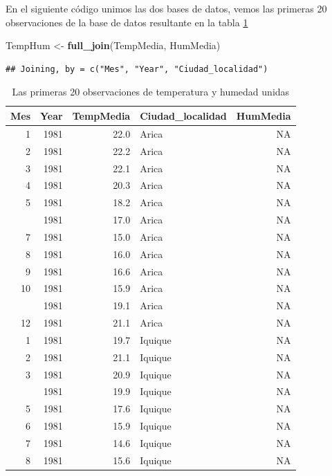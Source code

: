 \documentclass[]{book}
\newenvironment{Shaded}{\begin{snugshade}}{\end{snugshade}}
\newcommand{\KeywordTok}[1]{\textcolor[rgb]{0.13,0.29,0.53}{\textbf{#1}}}
\newcommand{\NormalTok}[1]{#1}
\newcommand{\StringTok}[1]{\textcolor[rgb]{0.31,0.60,0.02}{#1}}
\begin{document}
En el siguiente código unimos las dos bases de datos, vemos las primeras
20 observaciones de la base de datos resultante en la tabla
\ref{tab:TempHum}

\begin{Shaded}
\begin{Highlighting}[]
\NormalTok{TempHum <-}\StringTok{ }\KeywordTok{full_join}\NormalTok{(TempMedia, HumMedia)}
\end{Highlighting}
\end{Shaded}

\begin{verbatim}
## Joining, by = c("Mes", "Year", "Ciudad_localidad")
\end{verbatim}

\begin{table}

\caption{\label{tab:TempHum}Las primeras 20 observaciones de temperatura y humedad unidas}
\centering
\begin{tabular}[t]{rrrlr}
\toprule
Mes & Year & TempMedia & Ciudad\_localidad & HumMedia\\
\midrule
1 & 1981 & 22.0 & Arica & NA\\
2 & 1981 & 22.2 & Arica & NA\\
3 & 1981 & 22.1 & Arica & NA\\
4 & 1981 & 20.3 & Arica & NA\\
5 & 1981 & 18.2 & Arica & NA\\
\addlinespace
6 & 1981 & 17.0 & Arica & NA\\
7 & 1981 & 15.0 & Arica & NA\\
8 & 1981 & 16.0 & Arica & NA\\
9 & 1981 & 16.6 & Arica & NA\\
10 & 1981 & 15.9 & Arica & NA\\
\addlinespace
11 & 1981 & 19.1 & Arica & NA\\
12 & 1981 & 21.1 & Arica & NA\\
1 & 1981 & 19.7 & Iquique & NA\\
2 & 1981 & 21.1 & Iquique & NA\\
3 & 1981 & 20.9 & Iquique & NA\\
\addlinespace
4 & 1981 & 19.9 & Iquique & NA\\
5 & 1981 & 17.6 & Iquique & NA\\
6 & 1981 & 15.9 & Iquique & NA\\
7 & 1981 & 14.6 & Iquique & NA\\
8 & 1981 & 15.6 & Iquique & NA\\
\bottomrule
\end{tabular}
\end{table}
\end{document}
